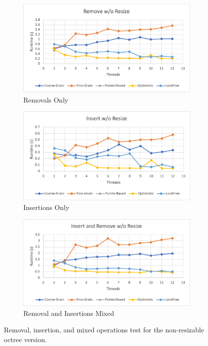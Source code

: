 \documentclass[conference]{IEEEtran}
\begin{document}
\begin{figure}[h!]
    \centering
    \begin{subfigure}{.5\textwidth}
		\includegraphics[width=\textwidth]{V2Remove.png}
		\caption{Removals Only}
		\label{fig:fig2a}
	\end{subfigure}
	\begin{subfigure}{.5\textwidth}
		\includegraphics[width=\textwidth]{V2Insert.png}
		\caption{Insertions Only}
		\label{fig:fig2b}
	\end{subfigure}
	\begin{subfigure}{.5\textwidth}
		\includegraphics[width=\textwidth]{V2InsertRemove.png}
		\caption{Removal and Insertions Mixed}
		\label{fig:fig2c}
	\end{subfigure}
    \caption{Removal, insertion, and mixed operations test for the non-resizable octree version.}
    \label{fig:fig2}
    
\end{figure}
\end{document}
